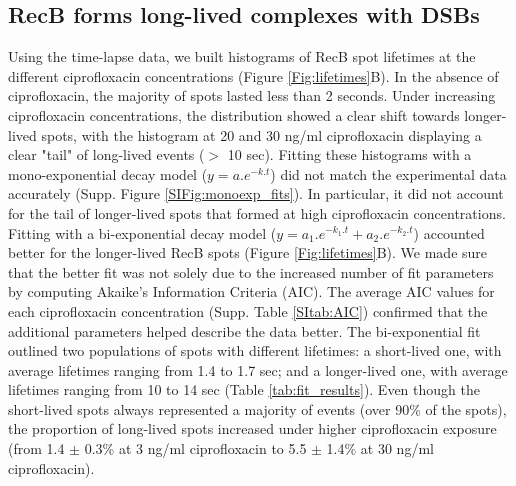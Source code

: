 \subsection*{RecB forms long-lived complexes with DSBs}
Using the time-lapse data, we built histograms of RecB spot lifetimes at the different ciprofloxacin concentrations (Figure \ref{Fig:lifetimes}B). In the absence of ciprofloxacin, the majority of spots lasted less than 2 seconds. Under increasing ciprofloxacin concentrations, the distribution showed a clear shift towards longer-lived spots, with the histogram at 20 and 30 ng/ml ciprofloxacin displaying a clear "tail" of long-lived events ($>$ 10 sec). Fitting these histograms with a mono-exponential decay model ($y = a.e^{-k.t}$) did not match the experimental data accurately (Supp. Figure \ref{SIFig:monoexp_fits}). In particular, it did not account for the tail of longer-lived spots that formed at high ciprofloxacin concentrations. Fitting with a bi-exponential decay model ($y = a_1.e^{-k_1.t} + a_2.e^{-k_2.t}$) accounted better for the longer-lived RecB spots (Figure \ref{Fig:lifetimes}B). We made sure that the better fit was not solely due to the increased number of fit parameters by computing Akaike's Information Criteria (AIC). The average AIC values for each ciprofloxacin concentration (Supp. Table \ref{SItab:AIC}) confirmed that the additional parameters helped describe the data better. The bi-exponential fit outlined two populations of spots with different lifetimes: a short-lived one, with average lifetimes ranging from 1.4 to 1.7 sec; and a longer-lived one, with average lifetimes ranging from 10 to 14 sec (Table \ref{tab:fit_results}). Even though the short-lived spots always represented a majority of events (over 90\% of the spots), the proportion of long-lived spots increased under higher ciprofloxacin exposure (from 1.4 $\pm$ 0.3\% at 3 ng/ml ciprofloxacin to 5.5 $\pm$ 1.4\% at 30 ng/ml ciprofloxacin).

